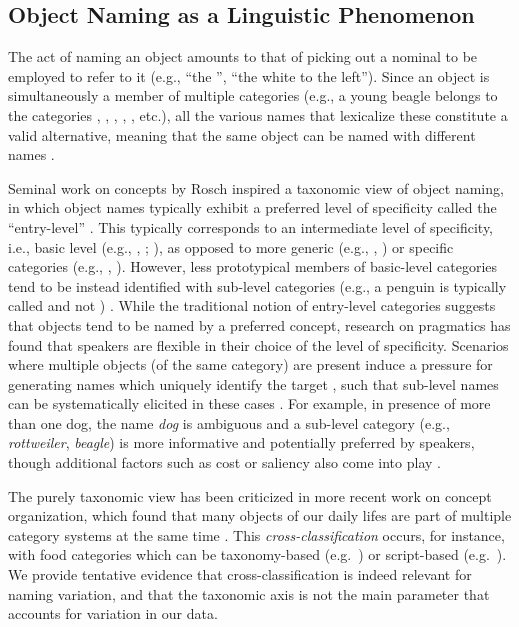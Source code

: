 \subsection{Object Naming as a Linguistic Phenomenon}

The act of naming an object amounts to that of picking out a nominal to be employed to refer to it (e.g., ``the '', ``the white  to the left'').
Since an object is simultaneously a member of multiple categories (e.g., a young beagle belongs to the categories , , , , , etc.), all the various names that lexicalize these constitute a valid alternative, meaning that the same object can be named with different names \cite{brown1958shall,murphy2004big}.

Seminal work on concepts by Rosch inspired a taxonomic view of object naming, in which object names typically exhibit a preferred level of specificity called the ``entry-level'' \cite{jolicoeur1984pictures}. This typically corresponds to an intermediate level of specificity, i.e., basic level (e.g., , ; ), as opposed to more generic (e.g., , ) or specific categories (e.g., , ). 
However, less prototypical members of basic-level categories tend to be instead identified with sub-level categories (e.g., a penguin is typically called  and not ) \cite{jolicoeur1984pictures}. 
While the traditional notion of entry-level categories suggests that objects tend to be named by a  preferred concept, research on pragmatics has found that speakers are flexible in their choice of the level of specificity.
Scenarios where multiple objects (of the same category) are present induce a pressure for generating names which uniquely identify the target \cite{olson1970language}, such that sub-level names can be systematically elicited in these cases \cite{rohde2012communicating,graf2016animal}.
For example, in presence of more than one dog, the name \textsl{dog} is ambiguous and a sub-level category (e.g., \textsl{rottweiler}, \textsl{beagle}) is more informative and potentially preferred by speakers, though additional factors such as cost or saliency also come into play \cite{graf2016animal,clark1983common}.

The purely taxonomic view has been criticized in more recent work on concept organization, which found that many objects of our daily lifes are part of multiple category systems at the same time \cite{ross1999food,SHAFTO20111}. 
This \textit{cross-classification} occurs, for instance, with food categories which can be taxonomy-based (e.g.\ ) or script-based (e.g.\  ).
We provide tentative evidence that cross-classification is indeed relevant for naming variation, and that the taxonomic axis is not the main parameter that accounts for variation in our data.

